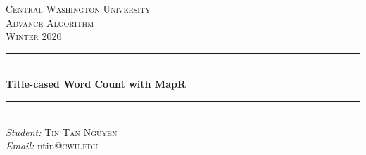 \documentclass[12pt]{article}
\begin{document}
    
    \begin{titlepage}
        
        \newcommand{\HRule}{\rule{\linewidth}{0.5mm}} %
        
        \center %
        
        
        \textsc{\large Central Washington University}\\[1.5cm] %
        \textsc{\Large Advance Algorithm}\\[0.5cm] %
        \textsc{\large Winter 2020}\\[0.5cm] %
        
        
        \HRule \\[0.5cm]
        { \Large \bfseries Title-cased Word Count with MapR}
        \\[0.2cm] %
        \HRule \\[0.5cm]
        
        
                \emph{Student:}
                    \textsc {\large Tin Tan Nguyen} \\			
                 \emph{Email:}   ntin\textsc{@cwu.edu}\\
        ~
        

\end{titlepage}
\end{document}
